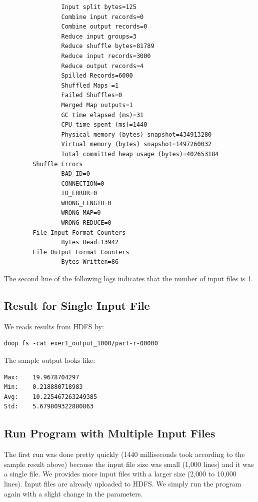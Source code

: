 \begin{lstlisting}
                Input split bytes=125
                Combine input records=0
                Combine output records=0
                Reduce input groups=3
                Reduce shuffle bytes=81789
                Reduce input records=3000
                Reduce output records=4
                Spilled Records=6000
                Shuffled Maps =1
                Failed Shuffles=0
                Merged Map outputs=1
                GC time elapsed (ms)=31
                CPU time spent (ms)=1440
                Physical memory (bytes) snapshot=434913280
                Virtual memory (bytes) snapshot=1497260032
                Total committed heap usage (bytes)=402653184
        Shuffle Errors
                BAD_ID=0
                CONNECTION=0
                IO_ERROR=0
                WRONG_LENGTH=0
                WRONG_MAP=0
                WRONG_REDUCE=0
        File Input Format Counters
                Bytes Read=13942
        File Output Format Counters
                Bytes Written=86

\end{lstlisting}

The second line of the following logs indicates that the number of
input files is 1.

\subsection{Result for Single Input File}

We reads results from HDFS by:

\begin{lstlisting}
doop fs -cat exer1_output_1000/part-r-00000
\end{lstlisting}

The sample output looks like:

\begin{lstlisting}
Max:    19.9678704297
Min:    0.218880718983
Avg:    10.225467263249385
Std:    5.679809322880863
\end{lstlisting}

\subsection{Run Program with Multiple Input Files}

The first run was done pretty quickly (1440 milliseconds took
according to the sample result above) because the input file size was
small (1,000 lines) and it was a single file. We provides more input
files with a larger size (2,000 to 10,000 lines). Input files are
already uploaded to HDFS. We simply run the program again with a
slight change in the parameters.

